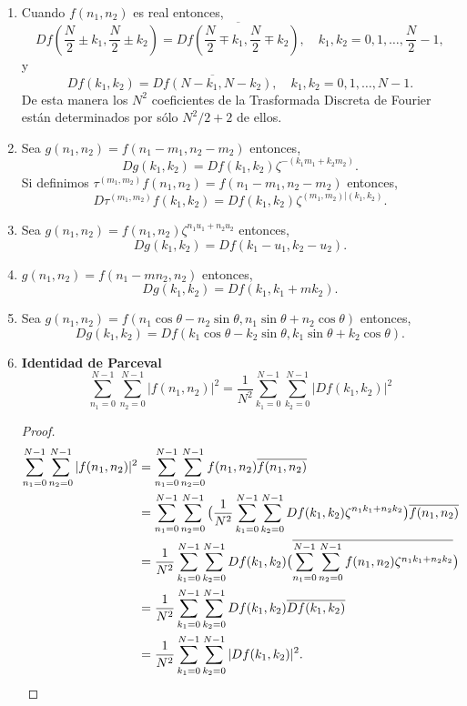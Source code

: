 \documentclass{article}
\begin{document}
\begin{enumerate}
	\item Cuando $f(n_1,n_2)$ es real entonces, 
	\[Df(\frac{N}{2}\pm k_1,\frac{N}{2}\pm k_2)=\overline{Df(\frac{N}{2}\mp k_1,\frac{N}{2}\mp k_2)}, \quad k_1,k_2=0,1,\dots, \frac{N}{2}-1,\]
	 y 
	\[Df(k_1,k_2)=\overline{Df(N-k_1,N-k_2)}, \quad k_1,k_2=0,1,\dots, N-1.\]
	De esta manera los $N^2$ coeficientes de la Trasformada Discreta de Fourier están determinados por sólo $N^2/2+2$ de ellos.
   
   \item Sea $g(n_1,n_2)=f(n_1-m_1,n_2-m_2)$ entonces,     \[Dg(k_1,k_2)=Df(k_1,k_2) \zeta^{-(k_1m_1+k_2m_2)}.\]
    Si definimos $\tau^{(m_1,m_2)}f(n_1,n_2)=f(n_1-m_1,n_2-m_2)$ entonces, \[D\tau^{(m_1,m_2)}f(k_1,k_2)=Df(k_1,k_2) \zeta^{(m_1,m_2)|(k_1,k_2)}.\]
   
   \item Sea $g(n_1,n_2)=f(n_1,n_2) \zeta^{n_1 u_1+n_2 u_2}$ entonces,
    \[Dg(k_1,k_2)=Df(k_1-u_1,k_2-u_2).\] 
	
	\item $g(n_1,n_2)=f(n_1-mn_2,n_2)$ entonces,
	\[Dg(k_1,k_2)=Df(k_1,k_1+mk_2).\]
	
	\item Sea $g(n_1,n_2)=f(n_1\cos\theta-n_2\sin\theta,n_1\sin\theta+n_2\cos\theta)$ entonces, \[Dg(k_1,k_2)=Df(k_1\cos\theta-k_2\sin\theta,k_1\sin\theta+k_2\cos\theta).\]
	
	\item \textbf{Identidad de Parceval}\\
	\[\sum^{N-1}_{n_1=0}\sum^{N-1}_{n_2=0}|f(n_1,n_2)|^2=\frac{1}{N^2}\sum^{N-1}_{k_1=0}\sum^{N-1}_{k_2=0}|Df(k_1,k_2)|^2\]
	\begin{proof}
	\begin{align*}
	\sum^{N-1}_{n_1=0}\sum^{N-1}_{n_2=0}|f(n_1,n_2)|^2&=\sum^{N-1}_{n_1=0}\sum^{N-1}_{n_2=0}f(n_1,n_2)\overline{f(n_1,n_2)}\\
	&=\sum^{N-1}_{n_1=0}\sum^{N-1}_{n_2=0}\big(\frac{1}{N^2}\sum^{N-1}_{k_1=0}\sum^{N-1}_{k_2=0} Df(k_1,k_2) \zeta^{n_1k_1+n_2k_2}\big)\overline{f(n_1,n_2)}\\
	&=\frac{1}{N^2}\sum^{N-1}_{k_1=0}\sum^{N-1}_{k_2=0}Df(k_1,k_2)\big(\overline{\sum^{N-1}_{n_1=0}\sum^{N-1}_{n_2=0}f(n_1,n_2) \zeta^{n_1k_1+n_2k_2}}\big)\\
	&=\frac{1}{N^2}\sum^{N-1}_{k_1=0}\sum^{N-1}_{k_2=0}Df(k_1,k_2)\overline{Df(k_1,k_2)}\\
	&=\frac{1}{N^2}\sum^{N-1}_{k_1=0}\sum^{N-1}_{k_2=0}|Df(k_1,k_2)|^2. \qedhere
	\end{align*}	
	\end{proof}
\end{enumerate}
\end{document}
